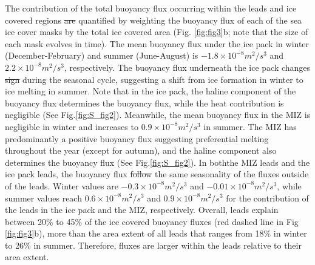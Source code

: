 \documentclass[lineno,sn-basic]{sn-jnl}%
\providecommand{\DIFadd}[1]{{\protect\color{blue}\uwave{#1}}} %
\providecommand{\DIFdel}[1]{{\protect\color{red}\sout{#1}}}                      %
\providecommand{\DIFaddbegin}{} %
\providecommand{\DIFaddend}{} %
\providecommand{\DIFdelbegin}{} %
\providecommand{\DIFdelend}{} %
\newcommand{\DIFscaledelfig}{0.5}
\newlength{\DIFdelgraphicswidth} %
\newlength{\DIFdelgraphicsheight} %
\newcommand{\DIFaddincludegraphics}[2][]{{\color{blue}\fbox{\DIFOincludegraphics[#1]{#2}}}} %
\newcommand{\DIFdelincludegraphics}[2][]{%
\sbox{\DIFdelgraphicsbox}{\DIFOincludegraphics[#1]{#2}}%
\settoboxwidth{\DIFdelgraphicswidth}{\DIFdelgraphicsbox} %
\settoboxtotalheight{\DIFdelgraphicsheight}{\DIFdelgraphicsbox} %
\scalebox{\DIFscaledelfig}{%
\parbox[b]{\DIFdelgraphicswidth}{\usebox{\DIFdelgraphicsbox}\\[-\baselineskip] \rule{\DIFdelgraphicswidth}{0em}}\llap{\resizebox{\DIFdelgraphicswidth}{\DIFdelgraphicsheight}{%
\setlength{\unitlength}{\DIFdelgraphicswidth}%
\begin{picture}(1,1)%
\thicklines\linethickness{2pt} %
{\color[rgb]{1,0,0}\put(0,0){\framebox(1,1){}}}%
{\color[rgb]{1,0,0}\put(0,0){\line( 1,1){1}}}%
{\color[rgb]{1,0,0}\put(0,1){\line(1,-1){1}}}%
\end{picture}%
}\hspace*{3pt}}} %
} %
\DeclareRobustCommand{\DIFaddbegin}{\DIFOaddbegin \let\includegraphics\DIFaddincludegraphics} %
\DeclareRobustCommand{\DIFaddend}{\DIFOaddend \let\includegraphics\DIFOincludegraphics} %
\DeclareRobustCommand{\DIFdelbegin}{\DIFOdelbegin \let\includegraphics\DIFdelincludegraphics} %
\DeclareRobustCommand{\DIFdelend}{\DIFOaddend \let\includegraphics\DIFOincludegraphics} %
\begin{document}
The contribution of the total buoyancy flux occurring within the leads and ice covered regions \DIFdelbegin \DIFdel{are }\DIFdelend \DIFaddbegin \DIFadd{is }\DIFaddend quantified by weighting the buoyancy flux of each of the sea ice cover masks by the total ice covered area (Fig. \ref{fig:fig3}b; note that the size of each mask evolves in time). The mean buoyancy flux under the ice pack in winter (December-February) and summer (June-August) is $-1.8 \times10^{-8} m^2/s^3$  and $2.2 \times10^{-8} m^2/s^3$, respectively. The buoyancy flux underneath the ice pack changes \DIFdelbegin \DIFdel{sign }\DIFdelend \DIFaddbegin \DIFadd{signs }\DIFaddend during the seasonal cycle, suggesting a shift from ice formation in winter to ice melting in summer. Note that in the ice pack, the haline component of the buoyancy flux determines the buoyancy flux, while the heat contribution is negligible (See Fig.\ref{fig:S_fig2}). Meanwhile, the mean buoyancy flux in the MIZ is negligible in winter and increases to $0.9 \times10^{-8}m^2/s^3$ in summer. The MIZ has predominantly a positive buoyancy flux suggesting preferential melting throughout the year (except for autumn), and the haline component also determines the buoyancy flux (See Fig.\ref{fig:S_fig2}). In both\DIFaddbegin \DIFadd{, }\DIFaddend the MIZ leads and the ice pack leads, the buoyancy flux \DIFdelbegin \DIFdel{follow }\DIFdelend \DIFaddbegin \DIFadd{follows }\DIFaddend the same seasonality of the fluxes outside of the leads. Winter values are $-0.3 \times10^{-8}m^2/s^3$ and $-0.01 \times10^{-8}m^2/s^3$, while summer values reach $0.6 \times10^{-8}m^2/s^3$ and $0.9 \times10^{-8}m^2/s^3$ for the contribution of the leads in the ice pack and the MIZ, respectively.
Overall, leads explain between 20\% to 45\% of the ice covered buoyancy fluxes (red dashed line in Fig \ref{fig:fig3}b), more than the area extent of all leads that ranges from 18\% in winter to 26\% in summer. Therefore, fluxes are larger within the leads relative to their area extent. 

\DIFdelbegin %
\end{document}
